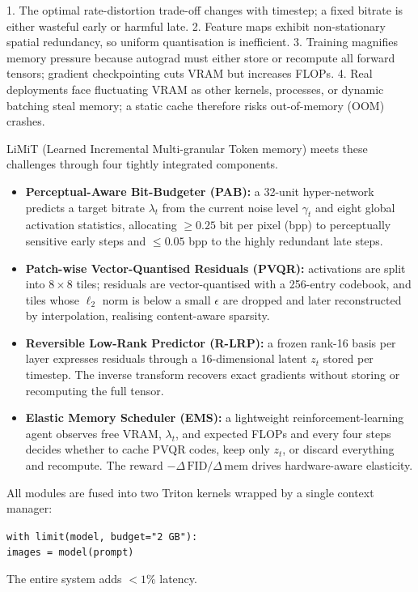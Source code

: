 \documentclass{article}
\begin{document}
1. The optimal rate-distortion trade-off changes with timestep; a fixed bitrate is either wasteful early or harmful late.
2. Feature maps exhibit non-stationary spatial redundancy, so uniform quantisation is inefficient.
3. Training magnifies memory pressure because autograd must either store or recompute all forward tensors; gradient checkpointing cuts VRAM but increases FLOPs.
4. Real deployments face fluctuating VRAM as other kernels, processes, or dynamic batching steal memory; a static cache therefore risks out-of-memory (OOM) crashes.

LiMiT (Learned Incremental Multi-granular Token memory) meets these challenges through four tightly integrated components.

\begin{itemize}
  \item \textbf{Perceptual-Aware Bit-Budgeter (PAB):} a 32-unit hyper-network predicts a target bitrate $\lambda_t$ from the current noise level $\gamma_t$ and eight global activation statistics, allocating $\ge 0.25$ bit per pixel (bpp) to perceptually sensitive early steps and $\le 0.05$ bpp to the highly redundant late steps.
  \item \textbf{Patch-wise Vector-Quantised Residuals (PVQR):} activations are split into $8\times8$ tiles; residuals are vector-quantised with a 256-entry codebook, and tiles whose $\ell_2$ norm is below a small $\epsilon$ are dropped and later reconstructed by interpolation, realising content-aware sparsity.
  \item \textbf{Reversible Low-Rank Predictor (R-LRP):} a frozen rank-16 basis per layer expresses residuals through a 16-dimensional latent $z_t$ stored per timestep. The inverse transform recovers exact gradients without storing or recomputing the full tensor.
  \item \textbf{Elastic Memory Scheduler (EMS):} a lightweight reinforcement-learning agent observes free VRAM, $\lambda_t$, and expected FLOPs and every four steps decides whether to cache PVQR codes, keep only $z_t$, or discard everything and recompute. The reward $-\Delta\,\mathrm{FID}/\Delta\,\mathrm{mem}$ drives hardware-aware elasticity.
\end{itemize}

All modules are fused into two Triton kernels wrapped by a single context manager:

\texttt{with limit(model, budget="2 GB"):\\ \quad images = model(prompt)}

The entire system adds $<1\%$ latency.
\end{document}
